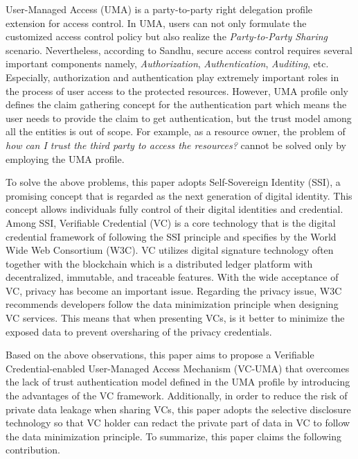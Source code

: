 \documentclass[conference, dvipdfmx]{IEEEtran} %
\begin{document}
\begin{sloppypar}
User-Managed Access (UMA)\cite{UMA} is a party-to-party right delegation profile extension for access control. In UMA, users can not only formulate the customized access control policy\cite{UMA_paper1} but also realize the \textit{Party-to-Party Sharing} scenario. Nevertheless, according to Sandhu\cite{AccessControl_principle}, secure access control requires several important components namely, \textit{Authorization}, \textit{Authentication},  \textit{Auditing}, etc. Especially, authorization and authentication play extremely important roles in the process of user access to the protected resources.
However, UMA profile only defines the claim gathering concept for the authentication part which means the user needs to provide the claim to get authentication, but the trust model among all the entities is out of scope. For example, as a resource owner, the problem of \textit{how can I trust the third party to access the resources?} cannot be solved only by employing the UMA profile. 


To solve the above problems, this paper adopts Self-Sovereign Identity (SSI), a promising concept that is regarded as the next generation of digital identity\cite{Path_to_Self_Sovereign}. This concept allows individuals fully control of their digital identities and credential. Among SSI, Verifiable Credential (VC)\cite{VC_model} is a  core technology that is the digital credential framework of following the SSI principle and specifies by the World Wide Web Consortium (W3C). VC utilizes digital signature technology often together with the blockchain which is a distributed ledger platform with decentralized, immutable, and traceable features. With the wide acceptance of VC, privacy has become an important issue. Regarding the privacy issue, W3C recommends developers follow the data minimization principle\cite{VC_Implementation_Guidelines} when designing VC services. This means that when presenting VCs, is it better to minimize the exposed data to prevent oversharing of the privacy credentials. 

Based on the above observations, this paper aims to propose a Verifiable Credential-enabled User-Managed Access Mechanism 
(VC-UMA) that overcomes the lack of trust authentication model defined in the UMA profile by introducing the advantages of the VC framework. Additionally, in order to reduce the risk of private data leakage when sharing VCs, this paper adopts the selective disclosure technology so that VC holder can redact the private part of data in VC to follow the data minimization principle.
To summarize, this paper claims the following contribution.


\end{sloppypar}
\end{document}

